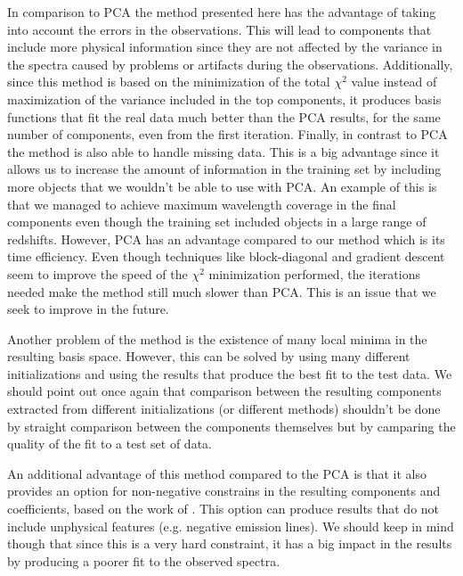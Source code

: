 \documentclass[12pt,preprint]{aastex}
\begin{document}
In comparison to PCA the method presented here has the advantage of taking into account the errors in the observations. This will lead to components that include more physical information since they are not affected by the variance in the spectra caused by problems or artifacts during the observations. Additionally, since this method is based on the minimization of the total $\chi^2$ value instead of maximization of the variance included in the top components, it produces basis functions that fit the real data much better than the PCA results, for the same number of components, even from the first iteration. Finally, in contrast to PCA the method is also able to handle missing data. This is a big advantage since it allows us to increase the amount of information in the training set by including more objects that we wouldn't be able to use with PCA. An example of this is that we managed to achieve maximum wavelength coverage in the final components even though the training set included objects in a large range of redshifts. However, PCA has an advantage compared to our method which is its time efficiency. Even though techniques like block-diagonal and gradient descent seem to improve the speed of the $\chi^2$ minimization performed, the iterations needed make the method still much slower than PCA. This is an issue that we seek to improve in the future.

Another problem of the method is the existence of many local minima in the resulting basis space. However, this can be solved by using many different initializations and using the results that produce the best fit to the test data. We should point out once again that comparison between the resulting components extracted from different initializations (or different methods) shouldn't be done by straight comparison between the components themselves but by camparing the quality of the fit to a test set of data.

An additional advantage of this method compared to the PCA is that it also provides an option for non-negative constrains in the resulting components and coefficients, based on the work of \cite{blanton}. This option can produce results that do not include unphysical features (e.g. negative emission lines). We should keep in mind though that since this is a very hard constraint, it has a big impact in the results by producing a poorer fit to the observed spectra.
\end{document}
